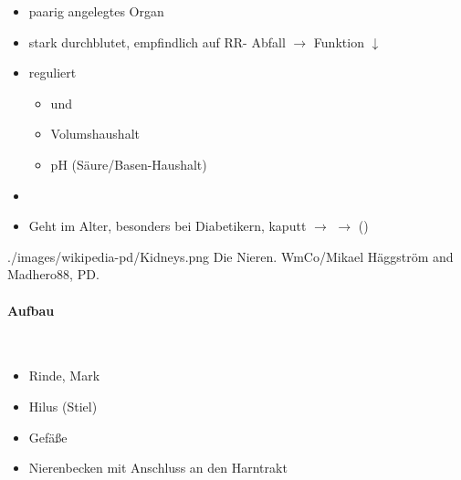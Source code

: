 {
\begin{itemize}
    \item paarig angelegtes Organ
    \item stark durchblutet, empfindlich auf RR- Abfall ${\rightarrow}$
    Funktion ${\downarrow}$
    \item reguliert
    \begin{itemize}
        \item {} und
        \item Volumshaushalt
        \item pH
        (Säure/Basen-Haushalt)
    \end{itemize}
    \item {}
    \item Geht im Alter, besonders bei Diabetikern, kaputt ${\rightarrow}$
    {\quotedblbase} ${\rightarrow}$
    {\quotedblbase}
    ()
\end{itemize}


}{}
{./images/wikipedia-pd/Kidneys.png}
{Die Nieren.}
{WmCo/Mikael Häggström and Madhero88, PD.}




\paragraph{Aufbau}~

\begin{itemize}
\item Rinde, Mark
\item Hilus (Stiel)
\item Gefäße
\item Nierenbecken mit Anschluss an den
Harntrakt
\end{itemize}



\paragraph{}

